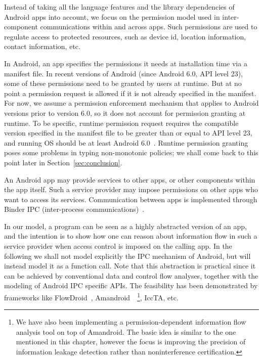 Instead of taking all the language features and the library dependencies of Android apps into account, we focus on the permission model used in inter-component communications within and across apps. Such permissions are used to regulate access to protected resources, such as device id, location information, contact information, etc.

In Android, an app specifies the permissions it needs at installation time via a manifest file. In recent versions of Android (since Android 6.0, API level 23), some of these permissions need to be granted by users at runtime. But
at no point a permission request is allowed if it is not already specified in the manifest.
For now, we assume a permission enforcement mechanism that applies to Android versions prior to version 6.0, so it does not
account for permission granting at runtime. To be specific, runtime permission request requires the compatible version specified in the manifest file to be greater than or equal to API level 23, and running OS should be at least Android 6.0~\cite{url:android-perm}. Runtime permission granting poses some problems in typing non-monotonic
policies; we shall come back to this point later in Section~\ref{sec:conclusion}.

An Android app may provide services to other apps,
or other components within the app itself. Such a service provider
may impose permissions on other apps who want to
access its services. Communication between apps is implemented
through Binder IPC (inter-process communications)~\cite{Android-Binder-IPC}.

In our model, a program can be seen as a highly abstracted version of an app, and the intention is to show how one can reason about information flow in such a service provider when access control is imposed on the calling app. In the following we shall not model explicitly the IPC mechanism of Android, but will instead model it as a function call. Note that this abstraction is practical since it can be achieved by conventional data and control flow analyses, together with the modeling of Android IPC specific APIs. The feasibility has been demonstrated by frameworks like FlowDroid~\cite{Arzt:2014:FPC:2666356.2594299}, Amandroid~\cite{Wei:2014:APG:2660267.2660357}~\footnote{We have also been implementing a permission-dependent information flow analysis tool on top of Amandroid. The basic idea is similar to the one mentioned in this chapter, however the focus is improving the precision of information leakage detection rather than noninterference certification.}, IccTA\cite{Li:2015:IDI:2818754.2818791}, etc.

